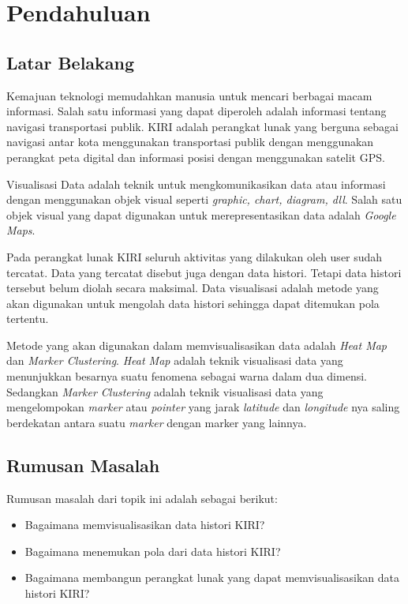 \chapter{Pendahuluan}
\label{chap:intro}
   
\section{Latar Belakang}
\label{sec:label}

Kemajuan teknologi memudahkan manusia untuk mencari berbagai macam informasi. Salah satu informasi yang dapat diperoleh adalah informasi tentang navigasi transportasi publik. KIRI  adalah perangkat lunak yang berguna sebagai navigasi antar kota menggunakan transportasi publik dengan menggunakan perangkat peta digital dan informasi posisi dengan menggunakan satelit GPS.

Visualisasi Data adalah teknik  untuk mengkomunikasikan data atau informasi dengan menggunakan objek visual  seperti \textit{graphic, chart, diagram, dll}. Salah satu objek visual yang dapat digunakan untuk merepresentasikan data adalah \textit{Google Maps}.

Pada perangkat lunak KIRI seluruh aktivitas yang dilakukan oleh user sudah tercatat. Data yang tercatat disebut juga dengan data histori. Tetapi data histori tersebut belum diolah secara maksimal. Data visualisasi adalah metode yang akan digunakan untuk mengolah data histori sehingga dapat ditemukan pola tertentu.

Metode yang akan digunakan dalam memvisualisasikan data adalah \textit{Heat Map } dan \textit{Marker Clustering}. \textit{Heat Map} adalah teknik visualisasi data yang menunjukkan besarnya suatu fenomena sebagai warna dalam dua dimensi. Sedangkan \textit{Marker Clustering}  adalah teknik visualisasi data  yang  mengelompokan \textit{marker} atau \textit{pointer} yang jarak \textit{latitude} dan \textit{longitude} nya saling berdekatan antara suatu \textit{marker} dengan marker yang lainnya.

\section{Rumusan Masalah}
\label{sec:rumusan}
Rumusan masalah dari topik ini adalah sebagai berikut:
\begin{itemize}
  \item Bagaimana memvisualisasikan data histori KIRI?
  \item Bagaimana menemukan pola dari data histori KIRI?
  \item Bagaimana membangun perangkat lunak yang dapat memvisualisasikan data histori KIRI?

\end{itemize}

